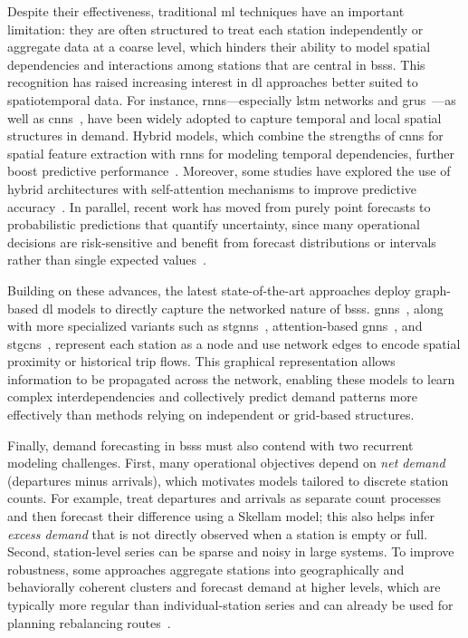     Despite their effectiveness, traditional \ac{ml} techniques have an important limitation: they are often structured to treat each station independently or aggregate data at a coarse level, which hinders their ability to model spatial dependencies and interactions among stations that are central in \acp{bss}. This recognition has raised increasing interest in \ac{dl} approaches better suited to spatiotemporal data. For instance, \acp{rnn}—especially \ac{lstm} networks and \acp{gru}~\cite{Wang2018, Zhang2018LSTM}—as well as \acp{cnn}~\cite{Ruffieux2017}, have been widely adopted to capture temporal and local spatial structures in demand. Hybrid models, which combine the strengths of \acp{cnn} for spatial feature extraction with \acp{rnn} for modeling temporal dependencies, further boost predictive performance~\cite{Mehdizadeh2022}. Moreover, some studies have explored the use of hybrid architectures with self-attention mechanisms to improve predictive accuracy~\cite{Ma2024}. In parallel, recent work has moved from purely point forecasts to probabilistic predictions that quantify uncertainty, since many operational decisions are risk-sensitive and benefit from forecast distributions or intervals rather than single expected values~\cite{Lim2024_HGA, Lim2022_DeepAR}.

    Building on these advances, the latest state-of-the-art approaches deploy graph-based \ac{dl} models to directly capture the networked nature of \acp{bss}. \acp{gnn}~\cite{Liang2023}, along with more specialized variants such as \acp{stgnn}~\cite{Feng2024}, attention-based \acp{gnn}~\cite{Polamarasetti2025}, and \acp{stgcn}~\cite{Xiao2021}, represent each station as a node and use network edges to encode spatial proximity or historical trip flows. This graphical representation allows information to be propagated across the network, enabling these models to learn complex interdependencies and collectively predict demand patterns more effectively than methods relying on independent or grid-based structures. 

    Finally, demand forecasting in \acp{bss} must also contend with two recurrent modeling challenges. First, many operational objectives depend on \emph{net demand} (departures minus arrivals), which motivates models tailored to discrete station counts. For example, \citet{Liu2021_ExcessDemand} treat departures and arrivals as separate count processes and then forecast their difference using a Skellam model; this also helps infer \emph{excess demand} that is not directly observed when a station is empty or full. Second, station-level series can be sparse and noisy in large systems. To improve robustness, some approaches aggregate stations into geographically and behaviorally coherent clusters and forecast demand at higher levels, which are typically more regular than individual-station series and can already be used for planning rebalancing routes~\cite{Li2015}.


